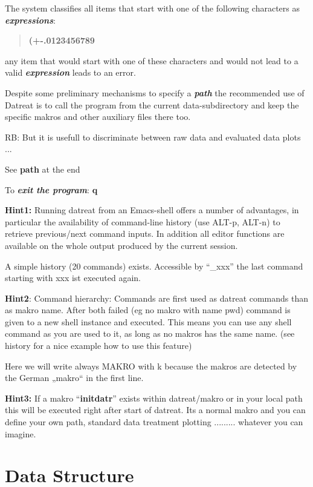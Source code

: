 \documentclass[]{article}
\begin{document}
The system classifies all items that start with one of the following
characters as \emph{\textbf{expressions}}:

\begin{quote}
\textbf{(+-.0123456789 }
\end{quote}

any item that would start with one of these characters and would not
lead to a valid \emph{\textbf{expression}} leads to an error.

Despite some preliminary mechanisms to specify a \emph{\textbf{path}}
the recommended use of Datreat is to call the program from the current
data-subdirectory and keep the specific makros and other auxiliary files
there too.

RB: But it is usefull to discriminate between raw data and evaluated
data plots ...

See \textbf{path} at the end

To \emph{\textbf{exit the program}}: \textbf{q}

\textbf{Hint1:} Running datreat from an Emacs-shell offers a number of
advantages, in particular the availability of command-line history (use
ALT-p, ALT-n) to retrieve previous/next command inputs. In addition all
editor functions are available on the whole output produced by the
current session.

A simple history (20 commands) exists. Accessible by ``\_xxx'' the last
command starting with xxx ist executed again.

\textbf{Hint2}: Command hierarchy: Commands are first used as datreat
commands than as makro name. After both failed (eg no makro with name
pwd) command is given to a new shell instance and executed. This means
you can use any shell command as you are used to it, as long as no
makros has the same name. (see history for a nice example how to use
this feature)

Here we will write always MAKRO with k because the makros are detected
by the German „makro`` in the first line.

\textbf{Hint3:} If a makro ``\textbf{initdatr}'' exists within
datreat/makro or in your local path this will be executed right after
start of datreat. Its a normal makro and you can define your own path,
standard data treatment plotting ......... whatever you can imagine.

\hypertarget{data-structure}{%
\section{Data Structure}\label{data-structure}}
\end{document}
